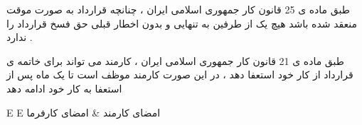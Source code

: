 \documentclass[12pt]{article}
\begin{document}
طبق ماده ی 25 قانون کار جمهوری اسلامی ایران ، چنانچه قرارداد به صورت موقت منعقد شده باشد هیچ یک از طرفین به تنهایی و بدون اخطار قبلی حق فسخ قرارداد را ندارد .

طبق ماده ی 21 قانون کار جمهوری اسلامی ایران ، کارمند می تواند برای خاتمه ی قرارداد از کار خود استعفا دهد ، در این صورت کارمند موظف است تا یک ماه پس از استعفا به کار خود ادامه دهد


\vspace{30pt}


\begin{center}
  \bgroup
  \def\arraystretch{1.5}%
  \begin{tabular}{ E E  }
    امضای کارمند
     &
      امضای کارفرما
      \\ 
  \end{tabular}
  \egroup
\end{center}

 
\end{document}
